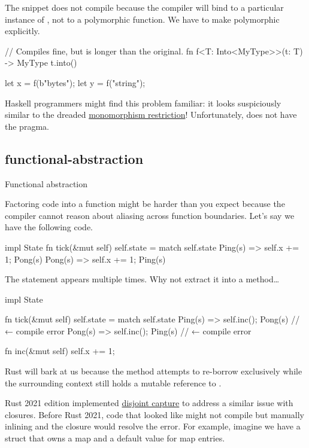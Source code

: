 \documentclass{article}
\begin{document}
The snippet does not compile because the compiler will bind  to a particular instance of , not to a polymorphic function.
We have to make  polymorphic explicitly.

\begin{code}[good]
// Compiles fine, but is longer than the original.
fn f<T: Into<MyType>>(t: T) -> MyType { t.into() }

let x = f(b"bytes");
let y = f("string");
\end{code}

Haskell programmers might find this problem familiar: it looks suspiciously similar to the dreaded \href{https://wiki.haskell.org/Monomorphism_restriction}{monomorphism restriction}!
Unfortunately,  does not have the \href{https://typeclasses.com/ghc/no-monomorphism-restriction}{} pragma.

\subsection{functional-abstraction}{Functional abstraction}

Factoring code into a function might be harder than you expect because the compiler cannot reason about aliasing across function boundaries.
Let's say we have the following code.

\begin{code}[rust]
impl State {
  fn tick(&mut self) {
    self.state = match self.state {
      Ping(s) => { self.x += 1; Pong(s) }
      Pong(s) => { self.x += 1; Ping(s) }
    }
  }
}
\end{code}

The  statement appears multiple times.
Why not extract it into a method\ldots

\begin{code}[bad]
impl State {
  fn tick(&mut self) {
    self.state = match self.state {
      Ping(s) => { self.inc(); Pong(s) } // ← compile error
      Pong(s) => { self.inc(); Ping(s) } // ← compile error
    }
  }

  fn inc(&mut self) {
    self.x += 1;
  }
}
\end{code}

Rust will bark at us because the method attempts to re-borrow  exclusively while the surrounding context still holds a mutable reference to .

Rust 2021 edition implemented \href{https://doc.rust-lang.org/edition-guide/rust-2021/disjoint-capture-in-closures.html}{disjoint capture} to address a similar issue with closures.
Before Rust 2021, code that looked like  might not compile but manually inlining  and the closure would resolve the error.
For example, imagine we have a struct that owns a map and a default value for map entries.
\end{document}
